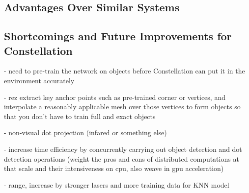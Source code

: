 \subsection{Advantages Over Similar Systems}
\subsection{Shortcomings and Future Improvements for Constellation}
- need to pre-train the network on objects before Constellation can put it in the environment accurately

- re^^: extract key anchor points such as pre-trained corner or vertices, and interpolate a reasonably applicable mesh over those vertices to form objects so that you don't have to train full and exact objects

- non-visual dot projection (infared or something else)

- increase time efficiency by concurrently carrying out object detection and dot detection operations (weight the pros and cons of distributed computations at that scale and their intensiveness on cpu, also weave in gpu acceleration)

- range, increase by stronger lasers and more training data for KNN model